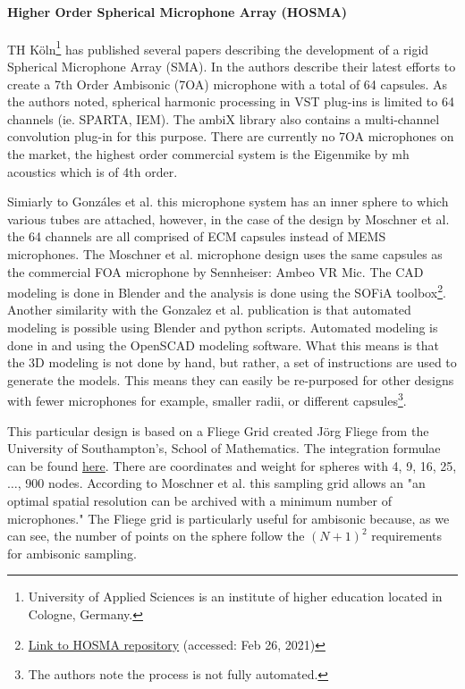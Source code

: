 \paragraph{Higher Order Spherical Microphone Array (HOSMA)}

TH Köln\footnote{University of Applied Sciences is an institute of higher education located in Cologne, Germany.} has published several papers describing the development of a rigid Spherical Microphone Array (SMA). In \cite{moschner2020development} the authors describe their latest efforts to create a 7th Order Ambisonic (7OA) microphone with a total of 64 capsules. As the authors noted, spherical harmonic processing in VST plug-ins is limited to 64 channels (ie. SPARTA, IEM). The ambiX library also contains a multi-channel convolution plug-in for this purpose. There are currently no 7OA microphones on the market, the highest order commercial system is the Eigenmike by mh acoustics which is of 4th order.

Simiarly to Gonzáles et al. \cite{gonzalez2018modular} this microphone system has an inner sphere to which various tubes are attached, however, in the case of the design by Moschner et al. the 64 channels are all comprised of ECM capsules instead of MEMS microphones. The Moschner et al. microphone design uses the same capsules as the commercial FOA microphone by Sennheiser: Ambeo VR Mic. The CAD modeling is done in Blender and the analysis is done using the SOFiA toolbox\footnote{\href{https://github.com/AudioGroupCologne/hosma}{Link to HOSMA repository} (accessed: Feb 26, 2021)}. Another similarity with the Gonzalez et al. publication is that automated modeling is possible using Blender and python scripts. Automated modeling is done in \cite{gonzalez2018modular} and \cite{lopez2019sphear} using the OpenSCAD modeling software. What this means is that the 3D modeling is not done by hand, but rather, a set of instructions are used to generate the models. This means they can easily be re-purposed for other designs with fewer microphones for example, smaller radii, or different capsules\footnote{The authors note the process is not fully automated.}. 

This particular design is based on a Fliege Grid \cite{fliege1999distribution} created Jörg Fliege from the University of Southampton's, School of Mathematics. The integration formulae can be found \href{http://www.personal.soton.ac.uk/jf1w07/nodes/nodes.html}{here}. There are coordinates and weight for spheres with 4, 9, 16, 25,$\dots$, 900 nodes. According to Moschner et al. \cite{moschner2020development} this sampling grid allows an "an optimal spatial resolution can be archived with a minimum number of microphones." The Fliege grid is particularly useful for ambisonic because, as we can see, the number of points on the sphere follow the $(N + 1)^2$ requirements for ambisonic sampling.

